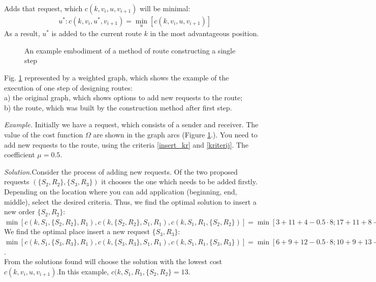 \documentclass[]{TAACpaper}
\begin{document}
Adds that request, which $c(k,v_i,u,v_{i+1})$ will be minimal:
\begin{align} 
\label{kriterij}
& u^*:c(k,v_i,u^*,v_{i+1})=\min_{u}[c(k,v_i,u,v_{i+1})]
\end{align} 
As a result, $u^*$ is added to the current route $k$ in the most advantageous position.

\begin{figure}[h]
	\caption{An example embodiment of a method of route constructing a single step}
	\label{ris:pict1}
\end{figure}

Fig. \ref {ris:pict1} represented by a weighted graph, which shows the example of the execution of one step of designing routes: \\
a) the original graph, which shows options to add new requests to the route; \\
b) the route, which was built by the construction method after first step.

\textit {Example.} Initially we have a request, which consists of a sender and receiver. The value of the cost function $\Omega $ are shown in the graph arcs (Figure \ref {ris:pict1}.). You need to add new requests to the route, using the criteria \ref{insert_kr} and \ref{kriterij}. The coefficient $\mu=0.5$.

		
\textit{Solution.}Consider the process of adding new requests. Of the two proposed requests $(\{S_2,R_2\},\{S_3,R_3\})$ it chooses the one which needs to be added firstly. Depending on the location where you can add application (beginning, end, middle), select the desired criteria. Thus, we find the optimal solution to insert a new order $\{S_2,R_2\}$:\\
$\min[c(k,S_1, \{S_2, R_2\}, R_1), c(k,\{S_2, R_2\}, S_1, R_1), c(k, S_1, R_1, \{S_2, R_2\})]=\min[3+11+4-0.5 \cdot 8; 17+11+8-0.5 \cdot 20; 2+11]=\min[14;26;13]$\\
We find the optimal place insert a new request $\{S_3,R_3\}$:\\ 
$\min[c(k,S_1, \{S_3, R_3\}, R_1), c(k,\{S_3, R_3\}, S_1, R_1), c(k, S_1, R_1, \{S_3, R_3\})]=\min[6+9+12-0.5 \cdot 8; 10+9+13-0.5 \cdot 20; 5+9]=\min[23;22;14]$.\\
From the solutions found will choose the solution with the lowest cost $c(k,v_i,u,v_{i+1})$.In this example, $c(k, S_1, R_1, \{S_2, R_2\}=13$.
\end{document}
